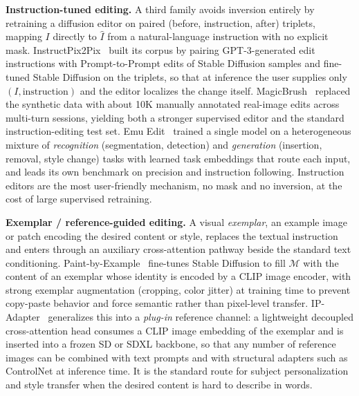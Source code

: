 \textbf{Instruction-tuned editing.}
A third family avoids inversion entirely by retraining a diffusion editor on paired (before, instruction, after) triplets, mapping $I$ directly to $\hat{I}$ from a natural-language instruction with no explicit mask.
InstructPix2Pix~\cite{brooks2023instructpix2pixlearningfollowimage} built its corpus by pairing GPT-3-generated edit instructions with Prompt-to-Prompt edits of Stable Diffusion samples and fine-tuned Stable Diffusion on the triplets, so that at inference the user supplies only $(I,\text{instruction})$ and the editor localizes the change itself.
MagicBrush~\cite{zhang2024magicbrush} replaced the synthetic data with about 10K manually annotated real-image edits across multi-turn sessions, yielding both a stronger supervised editor and the standard instruction-editing test set.
Emu Edit~\cite{sheynin2024emu} trained a single model on a heterogeneous mixture of \emph{recognition} (segmentation, detection) and \emph{generation} (insertion, removal, style change) tasks with learned task embeddings that route each input, and leads its own benchmark on precision and instruction following.
Instruction editors are the most user-friendly mechanism, no mask and no inversion, at the cost of large supervised retraining.

\textbf{Exemplar / reference-guided editing.}
A visual \emph{exemplar}, an example image or patch encoding the desired content or style, replaces the textual instruction and enters through an auxiliary cross-attention pathway beside the standard text conditioning.
Paint-by-Example~\cite{yang2023paintbyexample} fine-tunes Stable Diffusion to fill $\mathcal{M}$ with the content of an exemplar whose identity is encoded by a CLIP image encoder, with strong exemplar augmentation (cropping, color jitter) at training time to prevent copy-paste behavior and force semantic rather than pixel-level transfer.
IP-Adapter~\cite{ye2023ipadapter} generalizes this into a \emph{plug-in} reference channel: a lightweight decoupled cross-attention head consumes a CLIP image embedding of the exemplar and is inserted into a frozen SD or SDXL backbone, so that any number of reference images can be combined with text prompts and with structural adapters such as ControlNet at inference time.
It is the standard route for subject personalization and style transfer when the desired content is hard to describe in words.

